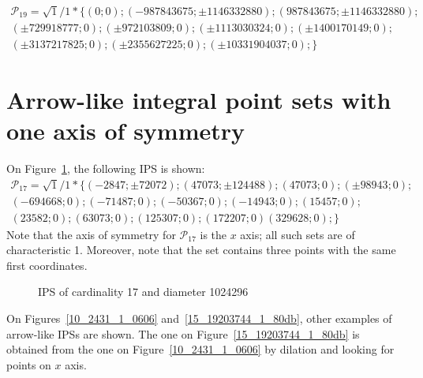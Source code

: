 \documentclass[12pt]{article}
\theoremstyle{theorem}
\theoremstyle{dfn}
\theoremstyle{remark}
\begin{document}
\begin{multline*}
	\mathcal{P}_{19}=
	\sqrt{1}/1*\{
		( 0 ; 0);
		( -987843675 ; \pm1146332880);
		( 987843675 ; \pm1146332880);
		\\
		( \pm729918777 ; 0);
		( \pm972103809 ; 0);
		( \pm1113030324 ; 0);
		( \pm1400170149 ; 0);
		\\
		( \pm3137217825 ; 0);
		( \pm2355627225 ; 0);
		( \pm10331904037 ; 0);
	\}
\end{multline*}

\section{Arrow-like integral point sets with one axis of symmetry}

On Figure~\ref{17_1024296_1_639b}, the following IPS is shown:
\begin{multline}
	\mathcal{P}_{17}=
	\sqrt{1}/1*\{
		( -2847 ; \pm72072);
		( 47073 ; \pm124488);
		( 47073 ; 0);
		( \pm98943 ; 0);
		\\
		( -694668 ; 0);
		( -71487 ; 0);
		( -50367 ; 0);
		( -14943 ; 0);
		( 15457 ; 0);
		\\
		( 23582 ; 0);
		( 63073 ; 0);
		( 125307 ; 0);
		( 172207 ; 0)
		( 329628 ; 0);
	\}
\end{multline}
Note that the axis of symmetry for $\mathcal{P}_{17}$ is the $x$ axis;
all such sets are of characteristic 1.
Moreover, note that the set contains three points with the same first coordinates.

\begin{figure}[h!]
\parbox{1\linewidth}{\caption{IPS of cardinality 17 and diameter 1024296}
\label{17_1024296_1_639b}}
\end{figure}

On Figures~\ref{10_2431_1_0606} and~\ref{15_19203744_1_80db}, other examples of arrow-like IPSs are shown.
The one on Figure~\ref{15_19203744_1_80db} is obtained from the one on Figure~\ref{10_2431_1_0606}
by dilation and looking for points on $x$ axis.
\end{document}
